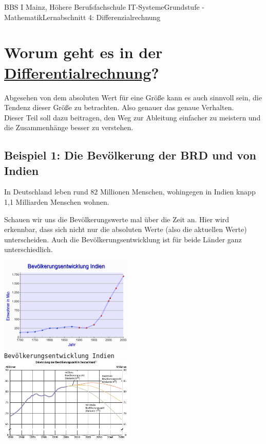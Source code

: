 \documentclass[11pt,twocolumn,oneside,openany,headings=optiontotoc,11pt,numbers=noenddot,final]{article}
\begin{document}
	\begin{worksheet}{BBS I Mainz, Höhere Berufsfachschule IT-Systeme}{Grundstufe - Mathematik}{Lernabschnitt 4: Differenzialrechnung}
		\setcounter{section}{6}
		\section{Worum geht es in der \underline{Differentialrechnung}?}
		Abgesehen von dem absoluten Wert für eine Größe kann es auch sinnvoll sein, die Tendenz dieser Größe zu betrachten. Also genauer das genaue Verhalten.\\
		Dieser Teil soll dazu beitragen, den Weg zur \grqq{}Ableitung\grqq{} einfacher zu meistern und die Zusammenhänge besser zu verstehen.
		\subsection*{Beispiel  1: Die Bevölkerung der BRD und von Indien}
		In Deutschland leben rund 82 Millionen Menschen, wohingegen in Indien knapp 1,1 Milliarden Menschen wohnen.\\
		\par\noindent
		Schauen wir uns die Bevölkerungswerte mal über die Zeit an. Hier wird erkennbar, dass sich nicht nur die absoluten Werte (also die aktuellen Werte) unterscheiden. Auch die Bevölkerungsentwicklung ist für beide Länder ganz unterschiedlich.\\
		\par\noindent
		\includegraphics[width=0.48\textwidth]{../99_Bilder/04_Skr_BevInd.png}\\
		\footnotesize{\texttt{Bevölkerungsentwicklung Indien}}\\
		\includegraphics[width=0.48\textwidth]{../99_Bilder/04_Skr_BevDeu.png}\\

\end{worksheet}
\end{document}
